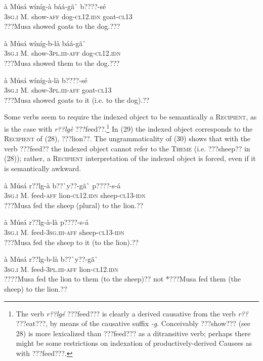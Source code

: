 \documentclass[output=paper]{langsci/langscibook}
\begin{document}
\ea \gll 
\label{bkm:Ref424217838}à    Músá  wíníg-à  báá-gã\`{ }    b????-sé
\\
%
\textsc{3sg.i  }  M.  show-\textsc{aff}  dog-\textsc{cl12.idn}  goat-\textsc{cl13}
\\\glt
???Musa showed goats to the dog.???
\z


\ea \gll 
à    Músá  wíníg-b-là    báá-gã\`{ }
\\
%
\textsc{3sg.i    }M.  show-\textsc{3pl.iii-aff}  dog-\textsc{cl12.idn}
\\\glt
???Musa showed them to the dog.???  
\z


\ea \gll 
\label{bkm:Ref424317424}à    Músá  wíníg-à-là    b????-sé
\\
%
\textsc{3sg.i  }  M.  show-\textsc{3pl.iii-aff}  goat-\textsc{cl13}
\\\glt
???Musa showed goats to it (i.e. to the dog).??
\z

Some verbs seem to require the indexed object to be semantically a \textsc{Recipient}, as is the case with \textit{r??lgè} ???feed??.\footnote{ The verb \textit{r??lgé} ???feed??? is clearly a derived causative from the verb \textit{r??} ???eat???, by means of the causative suffix \textit{{}-g}. Conceivably ???show??? (see 28) is more lexicalized than ???feed??? as a ditransitive verb; perhaps there might be some restrictions on indexation of productively-derived Causees as with ???feed???.}{ }In (29) the indexed object corresponds to the \textsc{Recipient} of (28), ???lion??. The ungrammaticality of (30) shows that with the verb ???feed?? the indexed object cannot refer to the \textsc{Theme} (i.e. ???sheep?? in (28)); rather, a \textsc{Recipient} interpretation of the indexed object is forced, even if it is semantically awkward.


\ea \gll 
\label{bkm:Ref424335625}à    Músá  r??lg-à    b??\`{ }y??-gã\`{ }    p????-s-á
\\
%
\textsc{3sg.i  }  M.  feed-\textsc{aff}  lion-\textsc{cl12.idn}  sheep-\textsc{cl13-idn}
\\\glt
???Musa fed the sheep (plural) to the lion.??
\z


\ea \gll 
\label{bkm:Ref424317641}à    Músá    r??lg-à-là    p????-s-á
\\
%
\textsc{3sg.i  }  M.    feed-\textsc{3sg.iii-aff}  sheep-\textsc{cl13-idn}
\\\glt
???Musa fed the sheep to it (to the lion).??
\z


\ea \gll 
\label{bkm:Ref424317670}à    Músá  r??lg-b-là      b??\`{ }y??-gã\`{ }
\\
%
\textsc{3sg.i  }  M.  feed-\textsc{3pl.iii-aff  }  lion-\textsc{cl12.idn}
\\\glt
????Musa fed the lion to them (to the sheep)?? not *???Musa fed them (the sheep) to the lion.??  
\z
\end{document}
